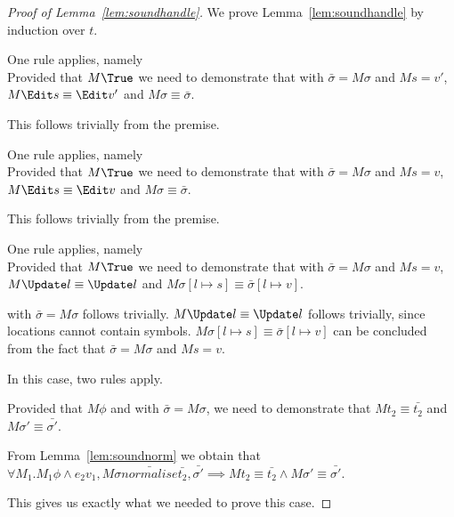 \begin{proof}[Proof of Lemma~\ref{lem:soundhandle}]
  We prove Lemma~\ref{lem:soundhandle} by induction over $t$.\\

    {One rule applies, namely \\
    Provided that $M\True$ we need to demonstrate that  with $\bar{\sigma}=M\sigma$ and $M s = v'$,
    $M \Edit s\equiv \Edit v'$ and $ M\sigma\equiv \bar{\sigma}$.

    This follows trivially from the premise.

    }

  {One rule applies, namely \\
  Provided that $M\True$ we need to demonstrate that  with $\bar{\sigma}=M\sigma$ and $M s = v$,
  $M \Edit s \equiv \Edit v$ and $ M\sigma\equiv \bar{\sigma}$.

  This follows trivially from the premise.

  }

  {One rule applies, namely \\
  Provided that $M\True$
  we need to demonstrate that   with $\bar{\sigma}=M\sigma$ and $M s = v$,
  $M \Update l \equiv \Update l$ and $ M\sigma[l\mapsto s]\equiv \bar{\sigma}[l\mapsto v]$.

   with $\bar{\sigma}=M\sigma$ follows trivially.
  $M \Update l \equiv \Update l$ follows trivially, since locations cannot contain symbols. $ M\sigma[l\mapsto s]\equiv \bar{\sigma}[l\mapsto v]$ can be concluded from the fact that $\bar{\sigma}=M\sigma$ and $M s = v$.

  }

  {
  In this case, two rules apply.\\
      {Provided that $M\phi$ and  with $\bar{\sigma}=M\sigma$,
      we need to demonstrate that $M t_2 \equiv \bar{t_2}$ and $M\sigma'\equiv\bar{\sigma'}$.

      From Lemma~\ref{lem:soundnorm} we obtain that $\forall M_1. M_1 \phi \land e_2 v_1,M\sigma\bar{normalise}\bar{t_2},\bar{\sigma'}\implies M t_2\equiv\bar{t_2}\land M \sigma'\equiv\bar{\sigma'}$.

      This gives us exactly what we needed to prove this case.

}}
\end{proof}
